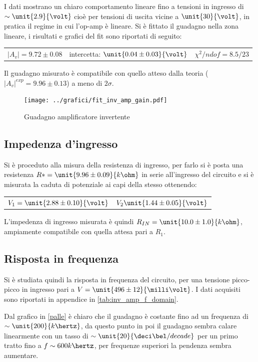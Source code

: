 \documentclass[10pt,a4paper]{article}
\begin{document}
I dati mostrano un chiaro comportamento lineare fino a tensioni in ingresso di $\sim \unit{2.9}{\volt}$ cioè per tensioni di uscita vicine a $\unit{30}{\volt}$, in pratica il regime in cui l'op-amp è lineare. Si è fittato il guadagno nella zona lineare, i risultati e grafici del fit sono riportati di seguito:

\begin{table}[h!]
	\centering
	\begin{tabular}{ccc}
		$|A_v| = 9.72 \pm 0.08$  & intercetta: $\unit{0.04 \pm 0.03}{\volt}$ & $\chi^2/ndof= 8.5 / 23$
	\end{tabular}
\end{table}
Il guadagno misurato è compatibile con quello atteso dalla teoria ($|A_v|^{exp} = 9.96 \pm 0.13$) a meno di $2\sigma$.
\begin{figure}[h!]
	\centering
	\texttt{[image: ../grafici/fit\_inv\_amp\_gain.pdf]}
	\caption{Guadagno amplificatore invertente}
	\label{fig:inv_amp_gain}
\end{figure}
 
\subsection{Impedenza d'ingresso}
Si è proceduto alla misura della resistenza di ingresso, per farlo si è posta una resistenza $R* = \unit{9.96 \pm 0.09}{k\ohm}$ in serie all'ingresso del circuito e si è misurata la caduta di potenziale ai capi della stesso ottenendo:

\begin{table}[h!]
	\centering
	\begin{tabular}{cc}
		$V_1 = \unit{2.88 \pm 0.10}{\volt}$  &  $V_2\unit{1.44 \pm 0.05}{\volt}$
	\end{tabular}
\end{table}

L'impedenza di ingresso misurata è quindi $R_{IN}=\unit{10.0 \pm 1.0}{k\ohm}$, ampiamente compatibile con quella attesa pari a $R_1$.

\subsection{Risposta in frequenza}
Si è studiata quindi la risposta in frequenza del circuito, per una tensione picco-picco in ingresso pari a $V = \unit{496 \pm 12}{\milli\volt}$. I dati acquisiti sono riportati in appendice in \tablename{\ref{tab:inv_amp_f_domain}}.

Dal grafico in \figurename{\ref{palle}} è chiaro che il guadagno è costante fino ad un frequenza di $\sim \unit{200}{k\hertz}$, da questo punto in poi il guadagno sembra calare linearmente con un tasso di $\sim \unit{20}{\deci\bel /decade}$ per un primo tratto fino a $f \sim {600}{k\hertz}$, per frequenze superiori la pendenza sembra aumentare.
\end{document}
